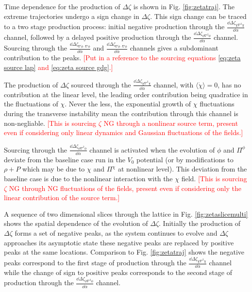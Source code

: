 Time dependence for the production of $\Delta\zeta$ is shown in Fig. \ref{fig:zetatraj}. The extreme trajectories undergo a sign change in $\Delta\zeta$. This sign change can be traced to a two stage production process: initial negative production through the $\frac{\dd\Delta\zeta_{\dot{\chi}\nabla^2\chi}}{\dd\alpha}$ channel, followed by a delayed positive production through the $\frac{\dd\Delta\zeta_{\dot{\phi}\nabla^2\phi}}{\dd\alpha}$ channel. Sourcing through the $\frac{\dd\Delta\zeta_{\nabla\dot{\phi}\cdot\nabla\phi}}{\dd\alpha}$ and $\frac{\dd\Delta\zeta_{\nabla\dot{\phi}\cdot\nabla\phi}}{\dd\alpha}$ channels gives a subdominant contribution to the peaks.
\textcolor{red}{[Put in a reference to the sourcing equations \eqref{eq:zeta source lap} and \eqref{eq:zeta source gdg}.]}

\Fzetatraj

The production of $\Delta\zeta$ sourced through the $\frac{\dd\Delta\zeta_{\dot{\chi}\nabla^2\chi}}{\dd\alpha}$ channel, with $\langle\dot{\chi}\rangle = 0$, has no contribution at the linear level, the leading order contribution being quadratice in the fluctuations of $\chi$. Never the less, the exponential growth of $\chi$ fluctuations during the transverse instability mean the contribution through this channel is non-negliable.
\textcolor{red}{[This is sourcing $\zeta$ NG through a nonlinear source term, present even if considering only linear dynamics and Gaussian fluctuations of the fields.]}

Sourcing through the $\frac{\dd\Delta\zeta_{\dot{\phi}\nabla^2\phi}}{\dd\alpha}$ channel is activated when the evolution of $\phi$ and $\Pi^\phi$ deviate from the baseline case run in the $V_0$ potential (or by modifications to $\rho + P$ which may be due to $\chi$ and $\Pi^\chi$ at nonlinear level). This deviation from the baseline case is due to the nonlinear interaction with the $\chi$ field.
\textcolor{red}{[This is sourcing $\zeta$ NG through NG fluctuations of the fields, present even if considering only the linear contribution of the source term.]}

\Fzetaslicemulti

A sequence of two dimensional slices through the lattice in Fig. \ref{fig:zetaslicemulti} shows the spatial dependence of the evolution of $\Delta\zeta$. Initially the production of $\Delta\zeta$ forms a set of negative peaks, as the system continues to evolve and $\Delta\zeta$ approaches its asymptotic state these negative peaks are replaced by positive peaks at the same locations. Comparison to Fig. \ref{fig:zetatraj} shows the negative peaks correspond to the first stage of production through the $\frac{\dd\Delta\zeta_{\dot{\chi}\nabla^2\chi}}{\dd\alpha}$ channel while the change of sign to positive peaks corresponds to the second stage of production through the $\frac{\dd\Delta\zeta_{\dot{\phi}\nabla^2\phi}}{\dd\alpha}$ channel.

